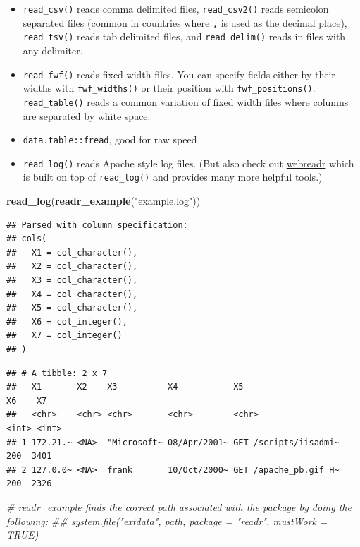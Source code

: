 \documentclass[]{book}
\newenvironment{Shaded}{\begin{snugshade}}{\end{snugshade}}
\newcommand{\CommentTok}[1]{\textcolor[rgb]{0.56,0.35,0.01}{\textit{#1}}}
\newcommand{\KeywordTok}[1]{\textcolor[rgb]{0.13,0.29,0.53}{\textbf{#1}}}
\newcommand{\NormalTok}[1]{#1}
\newcommand{\StringTok}[1]{\textcolor[rgb]{0.31,0.60,0.02}{#1}}
\providecommand{\tightlist}{%
  \setlength{\itemsep}{0pt}\setlength{\parskip}{0pt}}
\theoremstyle{definition}
\theoremstyle{definition}
\theoremstyle{definition}
\theoremstyle{remark}
\begin{document}
\begin{itemize}
\tightlist
\item
  \texttt{read\_csv()} reads comma delimited files,
  \texttt{read\_csv2()} reads semicolon separated files (common in
  countries where \texttt{,} is used as the decimal place),
  \texttt{read\_tsv()} reads tab delimited files, and
  \texttt{read\_delim()} reads in files with any delimiter.
\item
  \texttt{read\_fwf()} reads fixed width files. You can specify fields
  either by their widths with \texttt{fwf\_widths()} or their position
  with \texttt{fwf\_positions()}. \texttt{read\_table()} reads a common
  variation of fixed width files where columns are separated by white
  space.
\item
  \texttt{data.table::fread}, good for raw speed
\item
  \texttt{read\_log()} reads Apache style log files. (But also check out
  \href{https://github.com/Ironholds/webreadr}{webreadr} which is built
  on top of \texttt{read\_log()} and provides many more helpful tools.)
\end{itemize}

\begin{Shaded}
\begin{Highlighting}[]
\KeywordTok{read_log}\NormalTok{(}\KeywordTok{readr_example}\NormalTok{(}\StringTok{"example.log"}\NormalTok{))}
\end{Highlighting}
\end{Shaded}

\begin{verbatim}
## Parsed with column specification:
## cols(
##   X1 = col_character(),
##   X2 = col_character(),
##   X3 = col_character(),
##   X4 = col_character(),
##   X5 = col_character(),
##   X6 = col_integer(),
##   X7 = col_integer()
## )
\end{verbatim}

\begin{verbatim}
## # A tibble: 2 x 7
##   X1       X2    X3          X4           X5                       X6    X7
##   <chr>    <chr> <chr>       <chr>        <chr>                 <int> <int>
## 1 172.21.~ <NA>  "Microsoft~ 08/Apr/2001~ GET /scripts/iisadmi~   200  3401
## 2 127.0.0~ <NA>  frank       10/Oct/2000~ GET /apache_pb.gif H~   200  2326
\end{verbatim}

\begin{Shaded}
\begin{Highlighting}[]
\CommentTok{# readr_example finds the correct path associated with the package by doing the following:}
\CommentTok{## system.file("extdata", path, package = "readr", mustWork = TRUE)}
\end{Highlighting}
\end{Shaded}
\end{document}
